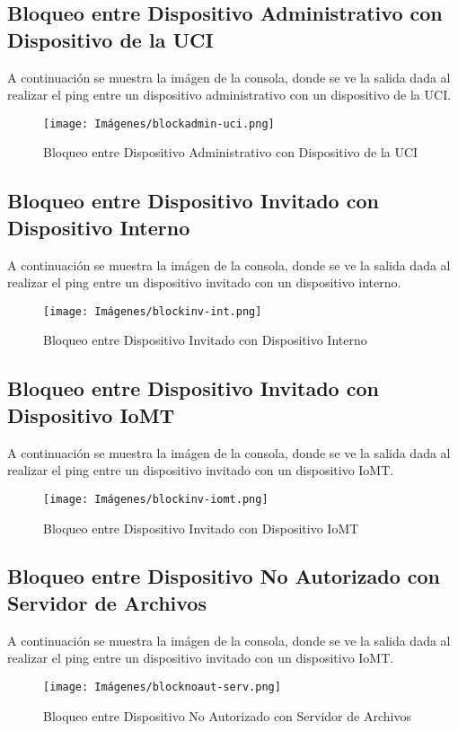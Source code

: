 \subsection{Bloqueo entre Dispositivo Administrativo con Dispositivo de la UCI}\label{anexo:blockadmin-uci}
A continuación se muestra la imágen de la consola, donde se ve la salida dada al realizar el ping entre un dispositivo administrativo con un dispositivo de la UCI.
\begin{figure}[H]
    \centering
    \texttt{[image: Imágenes/blockadmin-uci.png]}
    \caption{Bloqueo entre Dispositivo Administrativo con Dispositivo de la UCI}
\end{figure}
\subsection{Bloqueo entre Dispositivo Invitado con Dispositivo Interno}\label{anexo:blockinv-int}
A continuación se muestra la imágen de la consola, donde se ve la salida dada al realizar el ping entre un dispositivo invitado con un dispositivo interno.
\begin{figure}[H]
    \centering
    \texttt{[image: Imágenes/blockinv-int.png]}
    \caption{Bloqueo entre Dispositivo Invitado con Dispositivo Interno}
\end{figure}
\subsection{Bloqueo entre Dispositivo Invitado con Dispositivo IoMT}\label{anexo:blockinv-iomt}
A continuación se muestra la imágen de la consola, donde se ve la salida dada al realizar el ping entre un dispositivo invitado con un dispositivo IoMT.
\begin{figure}[H]
    \centering
    \texttt{[image: Imágenes/blockinv-iomt.png]}
    \caption{Bloqueo entre Dispositivo Invitado con Dispositivo IoMT}
\end{figure}
\subsection{Bloqueo entre Dispositivo No Autorizado con Servidor de Archivos}\label{anexo:blocknoaut-serv}
A continuación se muestra la imágen de la consola, donde se ve la salida dada al realizar el ping entre un dispositivo invitado con un dispositivo IoMT.
\begin{figure}[H]
    \centering
    \texttt{[image: Imágenes/blocknoaut-serv.png]}
    \caption{Bloqueo entre Dispositivo No Autorizado con Servidor de Archivos}
\end{figure}

